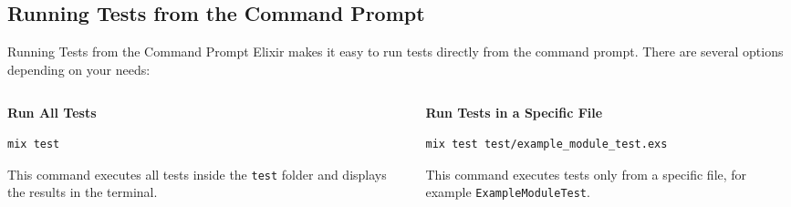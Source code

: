 \documentclass[aspectratio=169, table]{beamer}
\begin{document}
\subsection{Running Tests from the Command Prompt}
\begin{frame}[fragile]{Running Tests from the Command Prompt}
\vspace{15pt}
Elixir makes it easy to run tests directly from the command prompt.  
There are several options depending on your needs:
\vspace{10pt}
\begin{columns}

\begin{column}[t]{0.48\textwidth}
\textbf{Run All Tests}
\begin{lstlisting}[language=bash]
mix test
\end{lstlisting}

This command executes all tests  
inside the \texttt{test} folder and displays  
the results in the terminal.
\end{column}

\begin{column}[t]{0.52\textwidth}
\textbf{Run Tests in a Specific File}
\begin{lstlisting}[language=bash]
mix test test/example_module_test.exs
\end{lstlisting}

This command executes tests only from a specific file,  
for example \texttt{ExampleModuleTest}.
\end{column}

\end{columns}
\end{frame}
\end{document}
